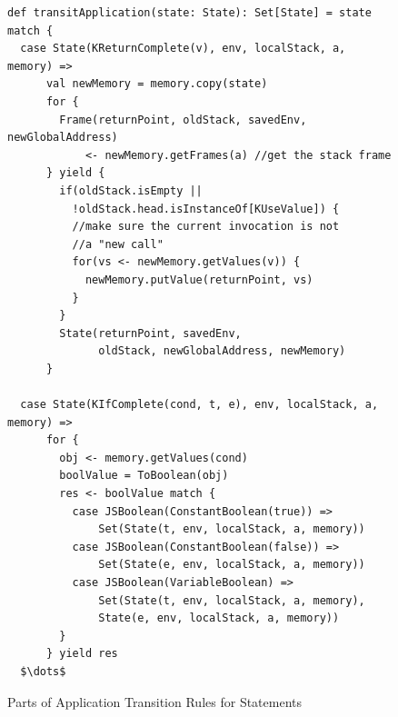 \documentclass[12pt]{report}
\begin{document}
\begin{figure}
\lstset{language=Scala, mathescape}
\begin{lstlisting}
def transitApplication(state: State): Set[State] = state match {
  case State(KReturnComplete(v), env, localStack, a, memory) =>
      val newMemory = memory.copy(state)
      for {
        Frame(returnPoint, oldStack, savedEnv, newGlobalAddress)
            <- newMemory.getFrames(a) //get the stack frame
      } yield {
        if(oldStack.isEmpty ||
          !oldStack.head.isInstanceOf[KUseValue]) {
          //make sure the current invocation is not
          //a "new call"
          for(vs <- newMemory.getValues(v)) {
            newMemory.putValue(returnPoint, vs)
          }
        }
        State(returnPoint, savedEnv,
              oldStack, newGlobalAddress, newMemory)
      }

  case State(KIfComplete(cond, t, e), env, localStack, a, memory) =>
      for {
        obj <- memory.getValues(cond)
        boolValue = ToBoolean(obj)
        res <- boolValue match {
          case JSBoolean(ConstantBoolean(true)) =>
              Set(State(t, env, localStack, a, memory))
          case JSBoolean(ConstantBoolean(false)) =>
              Set(State(e, env, localStack, a, memory))
          case JSBoolean(VariableBoolean) =>
              Set(State(t, env, localStack, a, memory),
              State(e, env, localStack, a, memory))
        }
      } yield res
  $\dots$

\end{lstlisting}
\caption{Parts of Application Transition Rules for Statements}
\label{fig:app-stmt}
\end{figure}
\end{document}
